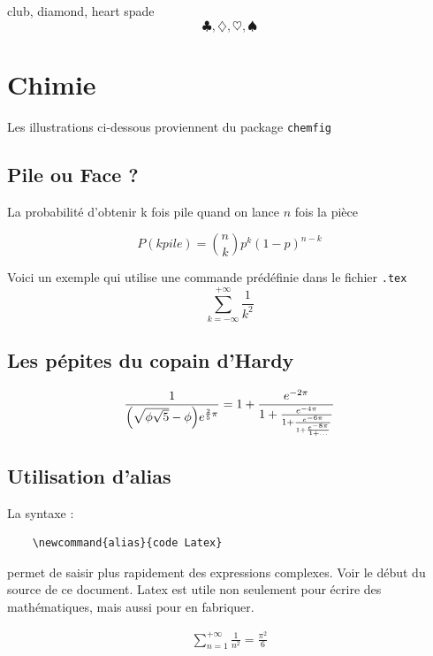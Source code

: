 \documentclass[twocolumn,a4paper]{IEEEtranfr}
\newcommand{\bear}{\begin{eqnarray}}
\newcommand{\ear}{\end{eqnarray}}
\newcommand{\sm}[1]{\sum_{#1=-\infty}^{+\infty}}
\newcommand{\smu}[1]{\sum_{#1=1}^{+\infty}}
\begin{document}
club, diamond, heart spade
$$\clubsuit, \diamondsuit, \heartsuit ,\spadesuit$$
\section{Chimie}

Les illustrations ci-dessous proviennent du package {\tt  chemfig}

\subsection{Pile ou Face ? }

La probabilité d'obtenir k fois pile quand on lance $n$ fois la pièce

\begin{equation}
    P(k pile)   = {n \choose k} p^k (1-p)^{ n-k}
\end{equation}

Voici un exemple qui utilise une commande prédéfinie dans le fichier {\tt .tex}
\begin{equation}
\sm{k} \frac{1}{k^2}
\end{equation}
\subsection{Les pépites du copain d'Hardy}

\begin{equation}
  \frac{1}{\Bigl(\sqrt{\phi \sqrt{5}}-\phi\Bigr) e^{\frac25 \pi}} =
    1 + \frac{e^{-2\pi}} 
             {1+\frac{e^{-4\pi}} 
             {1+\frac{e^{-6\pi}}
             {1+\frac{e^{-8\pi}} 
             {1+\ldots} } } }
\end{equation}
\subsection{Utilisation d'alias}

La syntaxe : 
\begin{verbatim} 
    \newcommand{alias}{code Latex}
\end{verbatim}
permet de saisir plus rapidement des expressions complexes. 
Voir le début du source de ce document. Latex est utile non seulement pour
écrire des mathématiques, mais aussi pour en fabriquer.

\bear
\smu{n} \frac{1}{n^2} =  \frac{\pi^2}{6}
\ear
\end{document}
